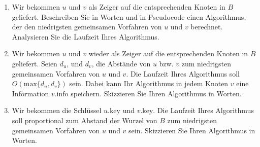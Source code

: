 \documentclass{lehramt-informatik-aufgabe}
\begin{document}
\begin{enumerate}


\item Wir bekommen $u$ und $v$ als Zeiger auf die entsprechenden Knoten
in $B$ geliefert. Beschreiben Sie in Worten und in Pseudocode einen
Algorithmus, der den niedrigsten gemeinsamen Vorfahren von $u$ und $v$
berechnet. Analysieren Sie die Laufzeit Ihres Algorithmus.



\item Wir bekommen $u$ und $v$ wieder als Zeiger auf die entsprechenden
Knoten in $B$ geliefert. Seien $d_u$, und $d_v$, die Abstände von $u$
bzw. $v$ zum niedrigsten gemeinsamen Vorfahren von $u$ und $v$. Die
Laufzeit Ihres Algorithmus soll $O(\text{max}\{d_u, d_v\})$ sein. Dabei
kann Ihr Algorithmus in jedem Knoten $v$ eine Information
$v.\text{info}$ speichern. Skizzieren Sie Ihren Algorithmus in Worten.


\item Wir bekommen die Schlüssel $u.\text{key}$ und $v.\text{key}$. Die
Laufzeit Ihres Algorithmus soll proportional zum Abstand der Wurzel von
$B$ zum niedrigsten gemeinsamen Vorfahren von $u$ und $v$ sein.
Skizzieren Sie Ihren Algorithmus in Worten.
\end{enumerate}
\end{document}
